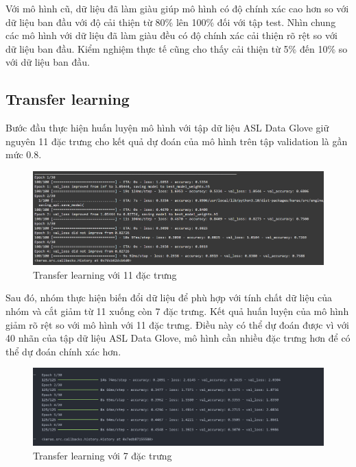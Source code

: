 Với mô hình cũ, dữ liệu đã làm giàu giúp mô hình có độ chính xác cao hơn so với dữ liệu ban đầu với độ cải thiện từ 80\% lên 100\% đối với tập test. Nhìn chung các mô hình với dữ liệu đã làm giàu đều có độ chính xác cải thiện rõ rệt so với dữ liệu ban đầu. Kiểm nghiệm thực tế cũng cho thấy cải thiện từ 5\% đến 10\% so với dữ liệu ban đầu.

\subsection{Transfer learning}
Bước đầu thực hiện huấn luyện mô hình với tập dữ liệu ASL Data Glove giữ nguyên 11 đặc trưng cho kết quả dự đoán của mô hình trên tập validation là gần mức 0.8. 

\begin{figure}[H]
    \centering
    \includegraphics[width=1.1\textwidth]{Images/Improvement results/transfer_learning_training_result_full_class.png}
    \caption{Transfer learning với 11 đặc trưng}
    \label{fig:transfer_learning_training_result_full_class}
\end{figure}


Sau đó, nhóm thực hiện biến đổi dữ liệu để phù hợp với tính chất dữ liệu của nhóm và cắt giảm từ 11 xuống còn 7 đặc trưng. Kết quả huấn luyện của mô hình giảm rõ rệt so với mô hình với 11 đặc trưng. Điều này có thể dự đoán được vì với 40 nhãn của tập dữ liệu ASL Data Glove, mô hình cần nhiều đặc trưng hơn để có thể dự đoán chính xác hơn.

\begin{figure}[H]
    \centering
    \includegraphics[width=1.1\textwidth]{Images/Improvement results/transfer_learning_training_result.png}
    \caption{Transfer learning với 7 đặc trưng}
    \label{fig:transfer_learning_training_result_7_class}
\end{figure}

